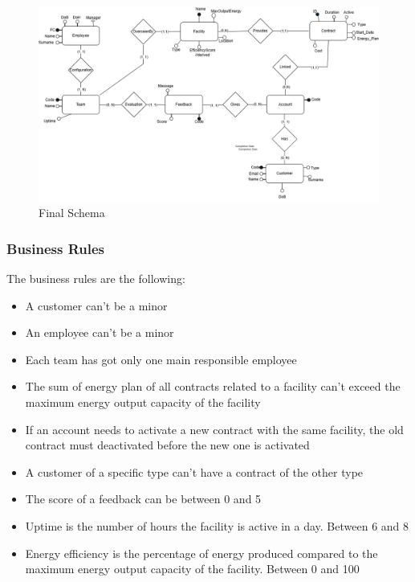 \begin{figure}[H]
    \centering
    \includegraphics[width=\textwidth]{images/ER.png}
    \caption{Final Schema}
\end{figure}


\subsubsection{Business Rules}
The business rules are the following:
\begin{itemize}
    \item A customer can't be a minor
    \item An employee can't be a minor
    \item Each team has got only one main responsible employee
    \item The sum of energy plan of all contracts related to a facility can't exceed the maximum energy output capacity of the facility
    \item If an account needs to activate a new contract with the same facility, the old contract must deactivated before the new one is activated
    \item A customer of a specific type can't have a contract of the other type
    \item The score of a feedback can be between 0 and 5
    \item Uptime is the number of hours the facility is active in a day. Between 6 and 8
    \item Energy efficiency is the percentage of energy produced compared to the maximum energy output capacity of the facility. Between 0 and 100
\end{itemize}



